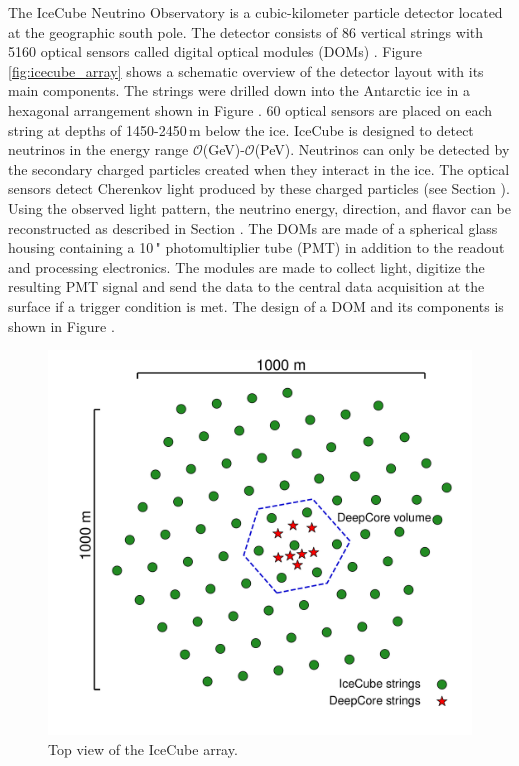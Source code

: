 The IceCube Neutrino Observatory  is a cubic-kilometer particle detector located at the geographic south pole.
The detector consists of 86 vertical strings with 5160 optical sensors called digital optical modules (DOMs) .
Figure \ref{fig:icecube_array} shows a schematic overview of the detector layout with its main components.
The strings were drilled down into the Antarctic ice in a hexagonal arrangement shown in Figure .
60 optical sensors are placed on each string at depths of 1450-2450\,m below the ice.
IceCube is designed to detect neutrinos in the energy range $\mathcal{O}$(GeV)-$\mathcal{O}$(PeV).
Neutrinos can only be detected by the secondary charged particles created when they interact in the ice.
The optical sensors detect Cherenkov light produced by these charged particles (see Section ).
Using the observed light pattern, the neutrino energy, direction, and flavor can be reconstructed as described in Section .
The DOMs are made of a spherical glass housing containing a 10\," photomultiplier tube (PMT) in addition to the readout and processing electronics.
The modules are made to collect light, digitize the resulting PMT signal and send the data to the central data acquisition at the surface if a trigger condition is met.
The design of a DOM and its components is shown in Figure .

\begin{figure}[h]
    \begin{center}
        \includegraphics[trim={2.0cm, 1.5cm, 0, 0}, clip, width=0.65\linewidth]{figures/icecube_deepcore/icecube_top_view_bw.pdf}
    \end{center}
    \caption[IceCube top view]{Top view of the IceCube array.}
\end{figure}

